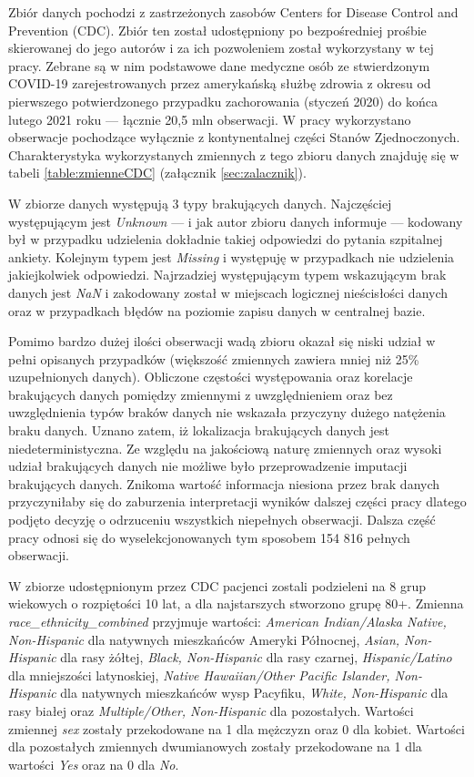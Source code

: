 \documentclass[polish, twoside, 12pt, a4paper]{article}
\theoremstyle{definition}
\theoremstyle{plain}
\theoremstyle{remark}
\begin{document}
Zbiór danych pochodzi z zastrzeżonych zasobów Centers for Disease Control and Prevention (CDC). Zbiór ten został udostępniony po bezpośredniej prośbie skierowanej do jego autorów i za ich pozwoleniem został wykorzystany w tej pracy. Zebrane są w nim podstawowe dane medyczne osób ze stwierdzonym COVID-19 zarejestrowanych przez amerykańską służbę zdrowia z okresu od pierwszego potwierdzonego przypadku zachorowania (styczeń 2020) do końca lutego 2021 roku --- łącznie 20,5 mln obserwacji. W pracy wykorzystano obserwacje pochodzące wyłącznie z kontynentalnej części Stanów Zjednoczonych. Charakterystyka wykorzystanych zmiennych z tego zbioru danych znajduję się w tabeli \ref{table:zmienneCDC} (załącznik \ref{sec:zalacznik}).

W zbiorze danych występują 3 typy brakujących danych. Najczęściej występującym jest \emph{Unknown} --- i jak autor zbioru danych informuje --- kodowany był w przypadku udzielenia dokładnie takiej odpowiedzi do pytania szpitalnej ankiety. Kolejnym typem jest  \emph{Missing} i występuję w przypadkach nie udzielenia jakiejkolwiek odpowiedzi. Najrzadziej występującym typem wskazującym brak danych jest \emph{NaN} i zakodowany został w miejscach logicznej nieścisłości danych oraz w przypadkach błędów na poziomie zapisu danych w centralnej bazie.

Pomimo bardzo dużej ilości obserwacji wadą zbioru okazał się niski udział w pełni opisanych przypadków (większość zmiennych zawiera mniej niż 25\% uzupełnionych danych). Obliczone częstości występowania oraz korelacje brakujących danych pomiędzy zmiennymi z uwzględnieniem oraz bez uwzględnienia typów braków danych nie wskazała przyczyny dużego natężenia braku danych. Uznano zatem, iż lokalizacja brakujących danych jest niedeterministyczna. Ze względu na jakościową naturę zmiennych oraz wysoki udział brakujących danych nie możliwe było przeprowadzenie imputacji brakujących danych. Znikoma wartość informacja niesiona przez brak danych przyczyniłaby się do zaburzenia interpretacji wyników dalszej części pracy dlatego podjęto decyzję o odrzuceniu wszystkich niepełnych obserwacji. Dalsza część pracy odnosi się do wyselekcjonowanych tym sposobem 154 816 pełnych obserwacji. 

W zbiorze udostępnionym przez CDC pacjenci zostali podzieleni na 8 grup wiekowych o rozpiętości 10 lat, a dla najstarszych stworzono grupę 80+. Zmienna \emph{race\_ethnicity\_combined} przyjmuje wartości: \emph{American Indian/Alaska Native, Non-Hispanic} dla natywnych mieszkańców Ameryki Północnej, \emph{Asian, Non-Hispanic} dla rasy żółtej, \emph{Black, Non-Hispanic} dla rasy czarnej, \emph{Hispanic/Latino} dla mniejszości latynoskiej, \emph{Native Hawaiian/Other Pacific Islander, Non-Hispanic} dla natywnych mieszkańców wysp Pacyfiku, \emph{White, Non-Hispanic} dla rasy białej oraz \emph{Multiple/Other, Non-Hispanic} dla pozostałych. Wartości zmiennej \emph{sex} zostały przekodowane na 1 dla mężczyzn oraz 0 dla kobiet. Wartości dla pozostałych zmiennych dwumianowych zostały przekodowane na 1 dla wartości \emph{Yes} oraz na 0 dla \emph{No}.
\end{document}
